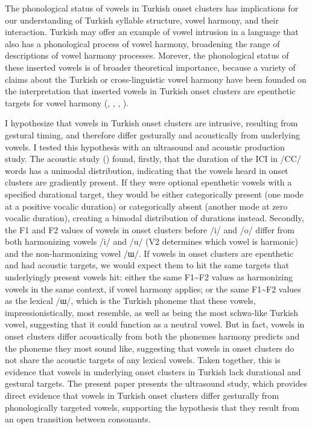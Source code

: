 \documentclass[output=paper,colorlinks,citecolor=brown]{langscibook}
\begin{document}
The phonological status of vowels in Turkish onset clusters has implications for our understanding of Turkish syllable structure, vowel harmony, and their interaction. Turkish may offer an example of vowel intrusion in a language that also has a phonological process of vowel harmony, broadening the range of descriptions of vowel harmony processes. Morever, the phonological status of these inserted vowels is of broader theoretical importance, because a variety of claims about the Turkish or cross-linguistic vowel harmony have been founded on the interpretation that inserted vowels in Turkish onset clusters are epenthetic targets for vowel harmony (\citealt{ClementsSezer:1982}, \citealt{Yavas1980}, \citealt{Kaun1999}, \citealt{Yildiz2010}).

I hypothesize that vowels in Turkish onset clusters are intrusive, resulting from gestural timing, and therefore differ gesturally and acoustically from underlying vowels. I tested this hypothesis with an ultrasound and acoustic production study. The acoustic study (\cite{Bellik2018, Bellik2019b}) found, firstly, that the duration of the ICI in /CC/ words has a unimodal distribution, indicating that the vowels heard in onset clusters are gradiently present. If they were optional epenthetic vowels with a specified durational target, they would be either categorically present (one mode at a positive vocalic duration) or categorically absent (another mode at zero vocalic duration), creating a bimodal distribution of durations instead. Secondly, the F1 and F2 values of vowels in onset clusters before /i/ and /o/ differ from both harmonizing vowels /i/ and /u/ (V2 determines which vowel is harmonic) and the non-harmonizing vowel /ɯ/. If vowels in onset clusters are epenthetic and had acoustic targets, we would expect them to hit the same targets that underlyingly present vowels hit: either the same F1{\textasciitilde}F2 values as harmonizing vowels in the same context, if vowel harmony applies; or the same F1{\textasciitilde}F2 values as the lexical /ɯ/, which is the Turkish phoneme that these vowels, impressionistically, most resemble, as well as being the most schwa-like Turkish vowel, suggesting that it could function as a neutral vowel. But in fact, vowels in onset clusters differ acoustically from both the phonemes harmony predicts and the phoneme they most sound like, suggesting that vowels in onset clusters do not share the acoustic targets of any lexical vowels. Taken together, this is evidence that vowels in underlying onset clusters in Turkish lack durational and gestural targets. The present paper presents the ultrasound study, which provides direct evidence that vowels in Turkish onset clusters differ gesturally from phonologically targeted vowels, supporting the hypothesis that they result from an open transition between consonants.
\end{document}
